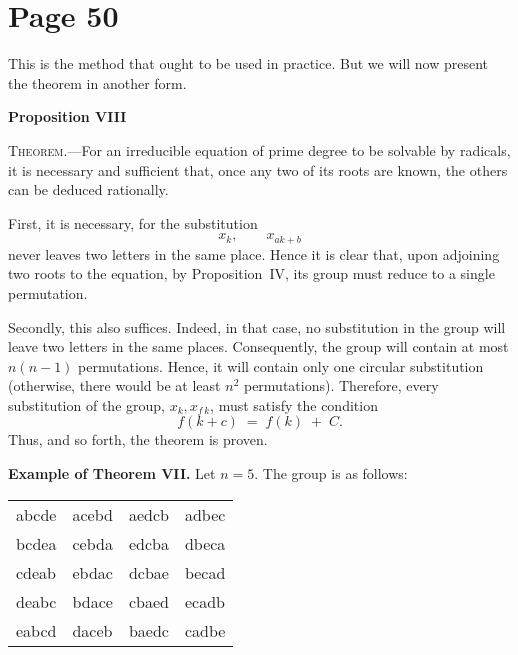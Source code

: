 \documentclass{article}
\begin{document}
\section*{Page 50}


This is the method that ought to be used in practice. But we will now present the theorem in another form.

\medskip
\noindent
\textbf{Proposition VIII}

\noindent
\textsc{Theorem.}---For an irreducible equation of prime degree to be solvable by radicals, it is necessary and sufficient that, once any two of its roots are known, the others can be deduced rationally.

\medskip
\noindent
First, it is necessary, for the substitution 
\[
x_{k}, \quad\quad x_{ak + b}
\]
never leaves two letters in the same place. Hence it is clear that, upon adjoining two roots to the equation, by Proposition~IV, its group must reduce to a single permutation.

\noindent
Secondly, this also suffices. Indeed, in that case, no substitution in the group will leave two letters in the same places. Consequently, the group will contain at most $n(n-1)$ permutations. Hence, it will contain only one circular substitution (otherwise, there would be at least $n^{2}$ permutations). Therefore, every substitution of the group, $x_{k}, x_{f\,k}$, must satisfy the condition
\[
f(k + c) \;=\; f(k) \;+\; C.
\]
Thus, and so forth, the theorem is proven.

\medskip
\noindent
\textbf{Example of Theorem VII.}
Let $n = 5$. The group is as follows:
\begin{center}
\begin{tabular}{l|l|l|l}
abcde & acebd & aedcb & adbec \\
bcdea & cebda & edcba & dbeca \\
cdeab & ebdac & dcbae & becad \\
deabc & bdace & cbaed & ecadb \\
eabcd & daceb & baedc & cadbe \\
\end{tabular}
\end{center}
\end{document}
